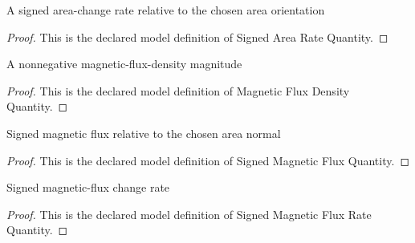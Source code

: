 \begin{definition}
  \label{def:physics:phyx-mini-0918:phyxminiproblems-problemphyxmini0918-signedarearatequantity}
  A signed area-change rate relative to the chosen area orientation
\end{definition}
\begin{proof}
  This is the declared model definition of Signed Area Rate Quantity.
\end{proof}
\begin{definition}
  \label{def:physics:phyx-mini-0918:phyxminiproblems-problemphyxmini0918-magneticfluxdensityquantity}
  A nonnegative magnetic-flux-density magnitude
\end{definition}
\begin{proof}
  This is the declared model definition of Magnetic Flux Density Quantity.
\end{proof}
\begin{definition}
  \label{def:physics:phyx-mini-0918:phyxminiproblems-problemphyxmini0918-signedmagneticfluxquantity}
  Signed magnetic flux relative to the chosen area normal
\end{definition}
\begin{proof}
  This is the declared model definition of Signed Magnetic Flux Quantity.
\end{proof}
\begin{definition}
  \label{def:physics:phyx-mini-0918:phyxminiproblems-problemphyxmini0918-signedmagneticfluxratequantity}
  Signed magnetic-flux change rate
\end{definition}
\begin{proof}
  This is the declared model definition of Signed Magnetic Flux Rate Quantity.
\end{proof}
